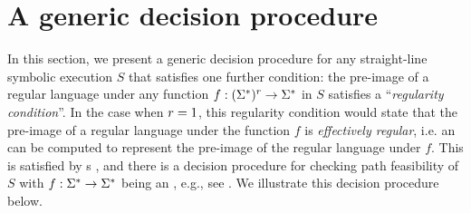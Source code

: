 

\section{A generic decision procedure} \label{sec:algo}
%

In this section, we present a generic decision procedure for any
straight-line symbolic execution $S$
that satisfies one further condition:
the pre-image of a regular language under any function 
$f: (\Sigma^*)^r \to \Sigma^*$ in $S$ satisfies a 
``\emph{regularity condition}''.
In the case when $r=1$, this regularity condition would state that the pre-image
of a regular language under the function $f$ is \emph{effectively regular}, i.e. an \FA{} can be computed to represent the pre-image of the regular language under $f$. This is
satisfied by \FT{}s \cite{Berstel,BG07,BG08}, and there is
a decision procedure for checking path feasibility of $S$ %
with $f: \Sigma^* \to \Sigma^*$ being an \FT{}, e.g., see 
\cite{LB16,BG07,BG08}. %
We illustrate this decision procedure below.

